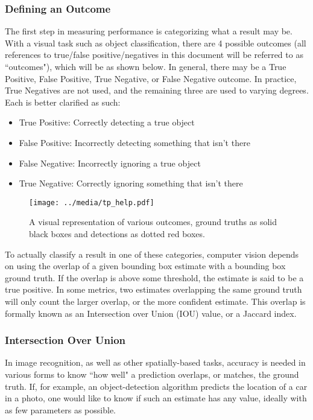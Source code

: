 \subsubsection{Defining an Outcome}
The first step in measuring performance is categorizing what a result may be. With a visual task such as object classification, there are 4 possible outcomes (all references to true/false positive/negatives in this document will be referred to as ``outcomes"), which will be  as shown below. In general, there may be a True Positive, False Positive, True Negative, or False Negative outcome. In practice, True Negatives are not used, and the remaining three are used to varying degrees. Each is better clarified as such:
\begin{itemize} \itemsep=-.5em
	\item True Positive: Correctly detecting a true object
	\item False Positive: Incorrectly detecting something that isn't there
	\item False Negative: Incorrectly ignoring a true object
	\item True Negative: Correctly ignoring something that isn't there
\end{itemize}

\begin{figure}[H]
	\centering
	\texttt{[image: ../media/tp\_help.pdf]}
	\caption{A visual representation of various outcomes, ground truths as solid black boxes and detections as dotted red boxes.}
	\label{tp_help}
\end{figure}

To actually classify a result in one of these categories, computer vision depends on using the overlap of a given bounding box estimate with a bounding box ground truth. If the overlap is above some threshold, the estimate is said to be a true positive. In some metrics, two estimates overlapping the same ground truth will only count the larger overlap, or the more confident estimate. This overlap is formally known as an Intersection over Union (IOU) value, or a Jaccard index.

\subsubsection{Intersection Over Union}
In image recognition, as well as other spatially-based tasks, accuracy is needed in various forms to know ``how well" a prediction overlaps, or matches, the ground truth. If, for example, an object-detection algorithm predicts the location of a car in a photo, one would like to know if such an estimate has any value, ideally with as few parameters as possible.

